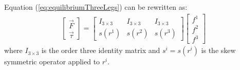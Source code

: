 \documentclass[]{article}
\begin{document}
Equation (\ref{eq:equilibriumThreeLegs}) can be rewritten as:
\begin{eqnarray}
\begin{bmatrix}
\vec{F}\\
\vec{\tau}
\end{bmatrix}
=
\begin{bmatrix}
I_{3\times3}	&I_{3\times3}	&I_{3\times3}	\\
s(r^1)	&s(r^2)	&s(r^3)
\end{bmatrix}
\begin{bmatrix}
f^1	\\
f^2	\\
f^3
\end{bmatrix}
\end{eqnarray}
where $I_{3\times3}$ is the order three identity matrix and $s^i=s(r^i)$ is the skew symmetric operator applied to $r^i$. 



\end{document}
